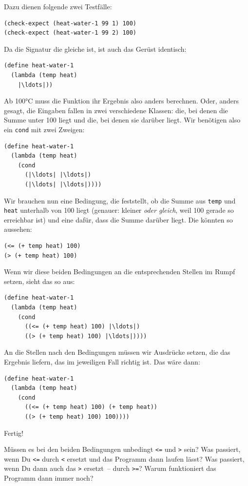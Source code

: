 Dazu dienen folgende zwei Testfälle:
%
\begin{lstlisting}
(check-expect (heat-water-1 99 1) 100)
(check-expect (heat-water-1 99 2) 100)
\end{lstlisting}
%
Da die Signatur die gleiche ist, ist auch das Gerüst identisch:
%
\begin{lstlisting}
(define heat-water-1
  (lambda (temp heat)
    |\ldots|))
\end{lstlisting}
%
Ab 100\si{\degree}C muss die Funktion ihr Ergebnis also anders berechnen.  Oder,
anders gesagt, die Eingaben fallen in zwei verschiedene Klassen: die,
bei denen die Summe unter 100 liegt und die, bei denen sie darüber
liegt.
Wir benötigen also ein \lstinline{cond} mit zwei
Zweigen:
%
\begin{lstlisting}
(define heat-water-1
  (lambda (temp heat)
    (cond
      (|\ldots| |\ldots|)
      (|\ldots| |\ldots|))))
\end{lstlisting}
%
Wir brauchen nun eine Bedingung, die feststellt, ob die Summe aus
\lstinline{temp} und \lstinline{heat} unterhalb von 100 liegt (genauer:
kleiner \emph{oder gleich}, weil 100 gerade so erreichbar ist) und
eine dafür, dass die Summe darüber liegt.  Die könnten so aussehen:
%
\begin{lstlisting}
(<= (+ temp heat) 100)
(> (+ temp heat) 100)
\end{lstlisting}
%
Wenn wir diese beiden Bedingungen an die entsprechenden Stellen im
Rumpf setzen, sieht das so aus:
%
\begin{lstlisting}
(define heat-water-1
  (lambda (temp heat)
    (cond
      ((<= (+ temp heat) 100) |\ldots|)
      ((> (+ temp heat) 100) |\ldots|))))
\end{lstlisting}
%
An die Stellen nach den Bedingungen müssen wir Ausdrücke setzen, die
das Ergebnis liefern, das im jeweiligen Fall richtig ist.  Das wäre dann:
%
\begin{lstlisting}
(define heat-water-1
  (lambda (temp heat)
    (cond
      ((<= (+ temp heat) 100) (+ temp heat))
      ((> (+ temp heat) 100) 100))))
\end{lstlisting}
%
Fertig!
%
%

%
\begin{aufgabeinline}
  Müssen es bei den beiden Bedingungen unbedingt \lstinline{<=} und
  \lstinline{>} sein?  Was passiert, wenn Du \lstinline{<=} durch \lstinline{<}
  ersetzt und das Programm dann laufen lässt?  Was passiert, wenn Du
  dann auch das \lstinline{>} ersetzt~-- durch \lstinline{>=}?  Warum
  funktioniert das Programm dann immer noch?
\end{aufgabeinline}
%
